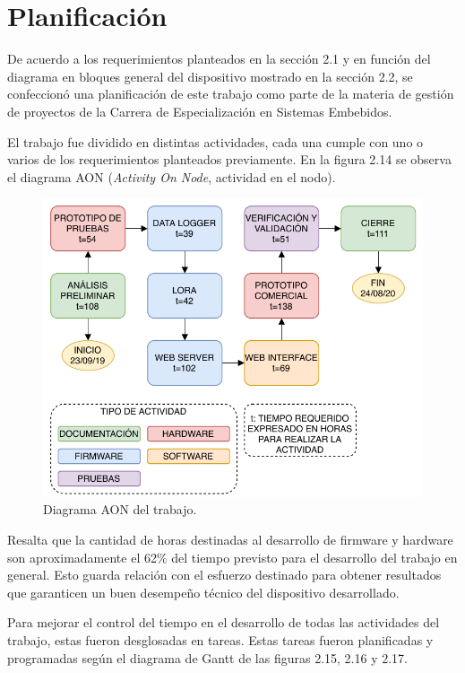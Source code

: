 \section{Planificación}

De acuerdo a los requerimientos planteados en la sección 2.1 y en función del diagrama en bloques general del dispositivo mostrado en la sección 2.2, se confeccionó una planificación de este trabajo como parte de la materia de gestión de proyectos de la Carrera de Especialización en Sistemas Embebidos.

El trabajo fue dividido en distintas actividades, cada una cumple con uno o varios de los requerimientos planteados previamente. En la figura 2.14 se observa el diagrama AON (\textit{Activity On Node}, actividad en el nodo).

\begin{figure}[h]
	\centering
	\includegraphics[scale=1]{./Figures/aon.pdf}
	\caption{Diagrama AON del trabajo.}
	\label{fig:diagramAON}
\end{figure}

Resalta que la cantidad de horas destinadas al desarrollo de firmware y hardware son aproximadamente el 62\% del tiempo previsto para el desarrollo del trabajo en general. Esto guarda relación con el esfuerzo destinado para obtener resultados que garanticen un buen desempeño técnico del dispositivo desarrollado.

Para mejorar el control del tiempo en el desarrollo de todas las actividades del trabajo, estas fueron desglosadas en tareas. Estas tareas fueron planificadas y programadas según el diagrama de Gantt de las figuras 2.15, 2.16 y 2.17.

